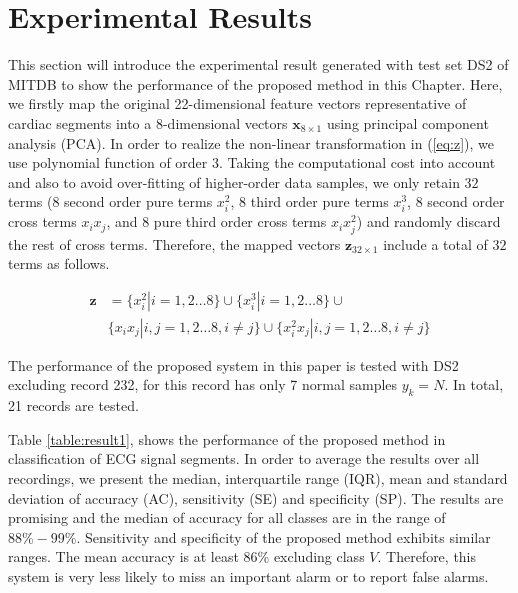 \section{Experimental Results}\label{sec:result1}

This section will introduce the experimental result generated with test set DS2 of MITDB to show the performance of the proposed method in this Chapter. Here, we firstly map the original 22-dimensional feature vectors representative of cardiac segments into a 8-dimensional vectors $\mathbf{x}_{8 \times 1}$ using principal component analysis (PCA). 
In order to realize the non-linear transformation in (\ref{eq:z}), we use polynomial function of order $3$. Taking the computational cost into account and also to avoid over-fitting of higher-order data samples, we only retain $32$ terms (8 second order pure terms $x_i^2$, 8 third order pure terms $x_i^3$, 8 second order cross terms $x_ix_j$, and 8 pure third order cross terms $x_i x_j^2$) and randomly discard the rest of cross terms. Therefore, the mapped vectors $\mathbf{z}_{32 \times 1}$ include a total of $32$ terms as follows.

\begin{align}
\label{eq:8-32}
\mathbf{z}&=\{x_i^2|i=1,2\dots 8\}\cup\{x_i^3|i=1,2\dots 8\} \cup\\
\nonumber
& \{x_ix_j|i,j=1,2\dots 8,i\neq j\} \cup  \{  x_i^2x_j | i,j=1,2\dots 8,i\neq j \}
\end{align}

The performance of the proposed system in this paper is tested with DS2 excluding record 232, for this record has only 7 normal samples $y_k=N$. In total, 21 records are tested.

Table \ref{table:result1}, shows the performance of the proposed method in classification of ECG signal segments. In order to average the results over all recordings, we present the median, interquartile range (IQR), mean and standard deviation of accuracy (AC), sensitivity (SE) and specificity (SP). The results are promising and the median of accuracy for all classes are in the range of $88\%-99\%$. Sensitivity and specificity of the proposed method exhibits similar ranges. The mean accuracy is at least $86\%$ excluding class $V$. Therefore, this system is very less likely to miss an important alarm or to report false alarms. 

